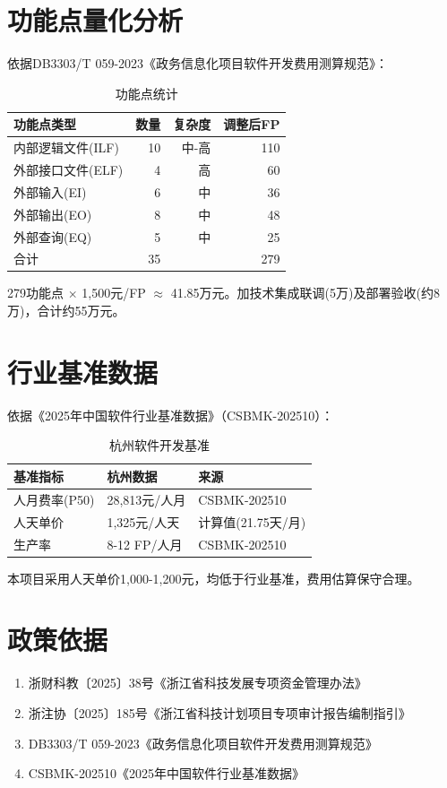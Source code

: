 \documentclass[12pt,a4paper]{ctexart}
\begin{document}
\section{功能点量化分析}
依据DB3303/T 059-2023《政务信息化项目软件开发费用测算规范》：
\begin{table}[H]\centering\caption{功能点统计}\begin{tabular}{@{}lrrr@{}}
\toprule
功能点类型 & 数量 & 复杂度 & 调整后FP \\
\midrule
内部逻辑文件(ILF) & 10 & 中-高 & 110 \\
外部接口文件(ELF) & 4 & 高 & 60 \\
外部输入(EI) & 6 & 中 & 36 \\
外部输出(EO) & 8 & 中 & 48 \\
外部查询(EQ) & 5 & 中 & 25 \\
\midrule
合计 & 35 & & 279 \\
\bottomrule
\end{tabular}\end{table}
279功能点 $\times$ 1,500元/FP $\approx$ 41.85万元。加技术集成联调(5万)及部署验收(约8万)，合计约55万元。

\section{行业基准数据}
依据《2025年中国软件行业基准数据》（CSBMK-202510）：
\begin{table}[H]\centering\caption{杭州软件开发基准}\begin{tabular}{@{}lll@{}}
\toprule
基准指标 & 杭州数据 & 来源 \\
\midrule
人月费率(P50) & 28,813元/人月 & CSBMK-202510 \\
人天单价 & 1,325元/人天 & 计算值(21.75天/月) \\
生产率 & 8-12 FP/人月 & CSBMK-202510 \\
\bottomrule
\end{tabular}\end{table}
本项目采用人天单价1,000-1,200元，均低于行业基准，费用估算保守合理。

\section{政策依据}
\begin{enumerate}[leftmargin=*]
\item 浙财科教〔2025〕38号《浙江省科技发展专项资金管理办法》
\item 浙注协〔2025〕185号《浙江省科技计划项目专项审计报告编制指引》
\item DB3303/T 059-2023《政务信息化项目软件开发费用测算规范》
\item CSBMK-202510《2025年中国软件行业基准数据》
\end{enumerate}
\end{document}
